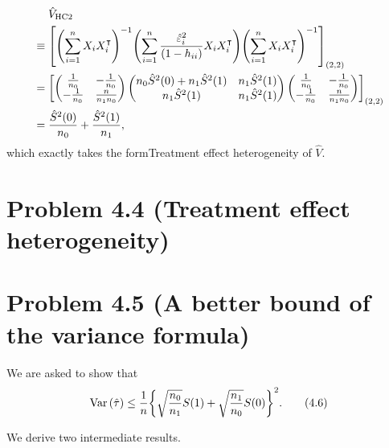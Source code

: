 \documentclass[10pt]{article}
\begin{document}
\begin{align*}
  &\mathrel{\phantom{=}} \hat{V}_{\text{HC2}} \\
  &\equiv {\left[ {\left( \sum_{i=1}^n X_i X_i^\intercal \right)}^{-1} {\left( \sum_{i=1}^n \frac{\hat{\varepsilon}_i^2}{(1 - h_{ii})} X_i X_i^\intercal \right)} {\left( \sum_{i=1}^n X_i X_i^\intercal \right)}^{-1} \right]}_{{\left( 2, 2 \right)}}\\
  &= {\left[ 
    \begin{pmatrix}
      \frac{1}{n_0} & -\frac{1}{n_0} \\
      -\frac{1}{n_0} & \frac{n}{n_1 n_0}
    \end{pmatrix}
    \begin{pmatrix}
      n_0 \hat{S}^2(0) + n_1 \hat{S}^2(1) & n_1 \hat{S}^2(1) \\
      n_1 \hat{S}^2(1) & n_1 \hat{S}^2(1)
    \end{pmatrix}
    \begin{pmatrix}
      \frac{1}{n_0} & -\frac{1}{n_0} \\
      -\frac{1}{n_0} & \frac{n}{n_1 n_0}
    \end{pmatrix}
   \right]}_{{\left( 2, 2 \right)}} \\
  &= \frac{\hat{S}^2(0)}{n_0} + \frac{\hat{S}^2(1)}{n_1},
\end{align*}
which exactly takes the formTreatment effect heterogeneity of $\hat{V}$.

\section*{Problem 4.4 (Treatment effect heterogeneity)}

\section*{Problem 4.5 (A better bound of the variance formula)}

We are asked to show that
\begin{align}
  \operatorname{Var}{\left( \hat{\tau} \right)}
  \leq \frac{1}{n}{\left\lbrace \sqrt{\frac{n_0}{n_1}} S(1) + \sqrt{\frac{n_1}{n_0}} S(0) \right\rbrace}^2. 
  \tag{4.6} \label{eq:4.6}
\end{align}

We derive two intermediate results.
\end{document}
